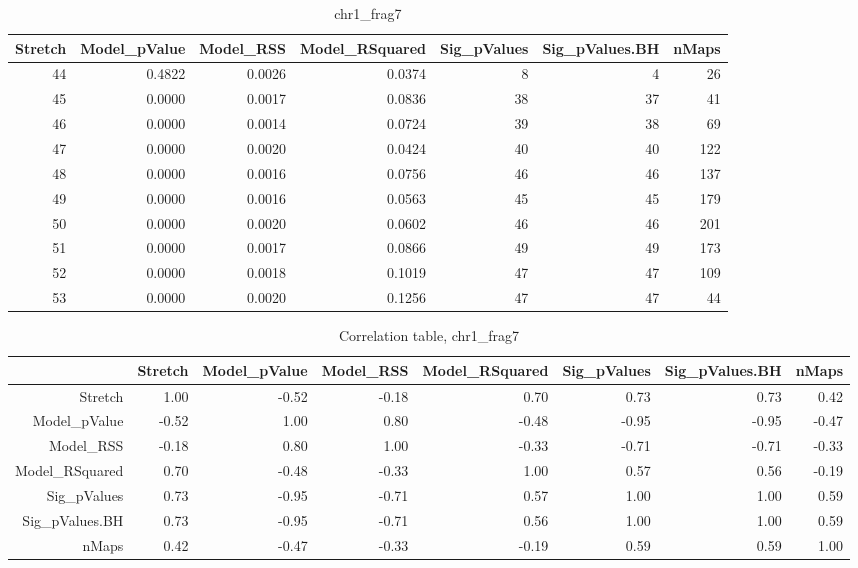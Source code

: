 \documentclass[11pt]{article}
\begin{document}
\begin{landscape}
\begin{table}[ht]
\centering
\begin{tabular}{rrrrrrr}
  \hline
Stretch & Model\_pValue & Model\_RSS & Model\_RSquared & Sig\_pValues & Sig\_pValues.BH & nMaps \\ 
  \hline
44 & 0.4822 & 0.0026 & 0.0374 & 8 & 4 & 26 \\ 
  45 & 0.0000 & 0.0017 & 0.0836 & 38 & 37 & 41 \\ 
  46 & 0.0000 & 0.0014 & 0.0724 & 39 & 38 & 69 \\ 
  47 & 0.0000 & 0.0020 & 0.0424 & 40 & 40 & 122 \\ 
  48 & 0.0000 & 0.0016 & 0.0756 & 46 & 46 & 137 \\ 
  49 & 0.0000 & 0.0016 & 0.0563 & 45 & 45 & 179 \\ 
  50 & 0.0000 & 0.0020 & 0.0602 & 46 & 46 & 201 \\ 
  51 & 0.0000 & 0.0017 & 0.0866 & 49 & 49 & 173 \\ 
  52 & 0.0000 & 0.0018 & 0.1019 & 47 & 47 & 109 \\ 
  53 & 0.0000 & 0.0020 & 0.1256 & 47 & 47 & 44 \\ 
   \hline
\end{tabular}
\caption{chr1\_frag7} 
\end{table}

\begin{table}[ht]
\centering
\begin{tabular}{rrrrrrrr}
  \hline
 & Stretch & Model\_pValue & Model\_RSS & Model\_RSquared & Sig\_pValues & Sig\_pValues.BH & nMaps \\ 
  \hline
Stretch & 1.00 & -0.52 & -0.18 & 0.70 & 0.73 & 0.73 & 0.42 \\ 
  Model\_pValue & -0.52 & 1.00 & 0.80 & -0.48 & -0.95 & -0.95 & -0.47 \\ 
  Model\_RSS & -0.18 & 0.80 & 1.00 & -0.33 & -0.71 & -0.71 & -0.33 \\ 
  Model\_RSquared & 0.70 & -0.48 & -0.33 & 1.00 & 0.57 & 0.56 & -0.19 \\ 
  Sig\_pValues & 0.73 & -0.95 & -0.71 & 0.57 & 1.00 & 1.00 & 0.59 \\ 
  Sig\_pValues.BH & 0.73 & -0.95 & -0.71 & 0.56 & 1.00 & 1.00 & 0.59 \\ 
  nMaps & 0.42 & -0.47 & -0.33 & -0.19 & 0.59 & 0.59 & 1.00 \\ 
   \hline
\end{tabular}
\caption{Correlation table, chr1\_frag7} 
\end{table}

\end{landscape}
\end{document}
